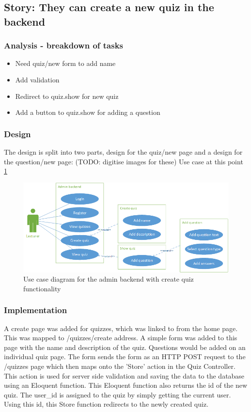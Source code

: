 \subsection{Story: They can create a new quiz in the backend}
\subsubsection{Analysis - breakdown of tasks}
\begin{itemize}
	\item Need quiz/new form to add name
	\item Add validation
	\item Redirect to quiz.show for new quiz
	\item Add a button to quiz.show for adding a question
\end{itemize}
\subsubsection{Design}
The design is split into two parts, design for the quiz/new page and a design for the question/new page:
(TODO: digitise images for these)
Use case at this point \ref{fig:quiz-create-use-case}
\begin{figure}
	\caption{Use case diagram for the admin backend with create quiz functionality}
	\centerline{\includegraphics{Chapter2/Iter-2/iter-2-use-case-create}}
	\label{fig:quiz-create-use-case}
\end{figure}
\subsubsection{Implementation}
A create page was added for quizzes, which was linked to from the home page. This was mapped to /quizzes/create address. A simple form was added to this page with the name and description of the quiz. Questions would be added on an individual quiz page. The form sends the form as an HTTP POST request to the /quizzes page which then maps onto the 'Store' action in the Quiz Controller. This action is used for server side validation and saving the data to the database using an Eloquent function. This Eloquent function also returns the id of the new quiz. The user\_id is assigned to the quiz by simply getting the current user. Using this id, this Store function redirects to the newly created quiz.

